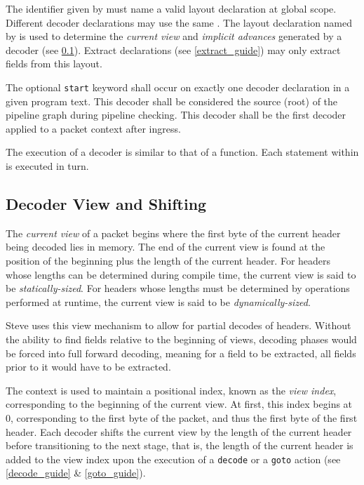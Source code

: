 The identifier given by  must name a valid layout declaration at global scope. Different decoder declarations may use the same . The layout declaration named by  is used to determine the \textit{current view} and \textit{implicit advances} generated by a decoder (see \ref{decoder_view}). Extract declarations (see \ref{extract_guide}) may only extract fields from this layout.

The optional \texttt{start} keyword shall occur on exactly one decoder declaration in a given program text. This decoder shall be considered the source (root) of the pipeline graph during pipeline checking. This decoder shall be the first decoder applied to a packet context after ingress.

The execution of a decoder is similar to that of a function. Each statement within  is executed in turn. 

\subsection{Decoder View and Shifting} \label{decoder_view}

The \textit{current view} of a packet begins where the first byte of the current header being decoded lies in memory. The end of the current view is found at the position of the beginning plus the length of the current header. For headers whose lengths can be determined during compile time, the current view is said to be \textit{statically-sized}. For headers whose lengths must be determined by operations performed at runtime, the current view is said to be \textit{dynamically-sized}.

Steve uses this view mechanism to allow for partial decodes of headers. Without the ability to find fields relative to the beginning of views, decoding phases would be forced into full forward decoding, meaning for a field to be extracted, all fields prior to it would have to be extracted.

The context is used to maintain a positional index, known as the \textit{view index}, corresponding to the beginning of the current view. At first, this index begins at 0, corresponding to the first byte of the packet, and thus the first byte of the first header. Each decoder shifts the current view by the length of the current header before transitioning to the next stage, that is, the length of the current header is added to the view index upon the execution of a \texttt{decode} or a \texttt{goto} action (see \ref{decode_guide} \& \ref{goto_guide}).

